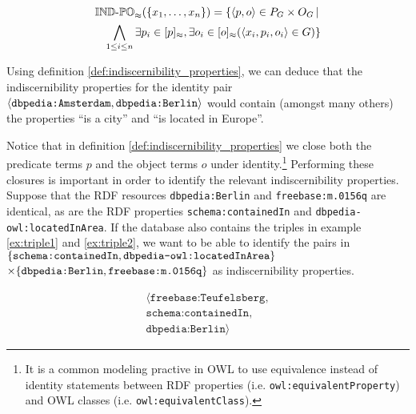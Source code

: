 \begin{definition}
\label{def:indiscernibility_properties}
\begin{align}
  \operatorname{{\mathbb{IND}-\mathbb{PO}}}_{\approx}(\{x_1,\ldots,x_n\})
=
  \{
    \langle p,o\rangle \in P_G \times O_G
  \,\vert\,\nonumber\\
    \bigwedge_{1 \leq i \leq n}
      \exists p_i \in [p]_{\approx},
        \exists o_i \in [o]_{\approx}(
          \langle x_i,p_i,o_i\rangle \in G
        )
  \}\nonumber
\end{align}
\end{definition}

\noindent Using definition \ref{def:indiscernibility_properties},
  we can deduce that the indiscernibility properties for
  the identity pair
  {\small $\langle\texttt{dbpedia:Amsterdam},\texttt{dbpedia:Berlin}\rangle$}
  would contain (amongst many others) the properties
  ``is a city'' and ``is located in Europe''.

Notice that in definition \ref{def:indiscernibility_properties}
  we close both the predicate terms $p$ and the object terms $o$
  under identity.\footnote{
    It is a common modeling practive in OWL to use equivalence
      instead of identity statements between RDF properties
      (i.e. \texttt{owl:equivalentProperty})
      and OWL classes
      (i.e. \texttt{owl:equivalentClass}).
  }
Performing these closures is important in order to identify
  the relevant indiscernibility properties.
Suppose that the RDF resources {\small \texttt{dbpedia:Berlin}}
  and {\small \texttt{freebase:m.0156q}} are identical,
  as are the RDF properties {\small \texttt{schema:containedIn}} and
  {\small \texttt{dbpedia-owl:locatedInArea}}.
If the database also contains the triples in
  example \ref{ex:triple1} and \ref{ex:triple2},
  we want to be able to identify the pairs in
  {\small $\{\texttt{schema:containedIn},\texttt{dbpedia-owl:locatedInArea}\}$}
  {\small $\times \{\texttt{dbpedia:Berlin},\texttt{freebase:m.0156q}\}$}
  as indiscernibility properties.

\small
\begin{example}[Triple 1]
\label{ex:triple1}
\begin{align}
\langle
  \texttt{freebase:Teufelsberg},\\
  \texttt{schema:containedIn},\nonumber\\
  \texttt{dbpedia:Berlin}
\rangle\nonumber
\end{align}
\end{example}
\normalsize

